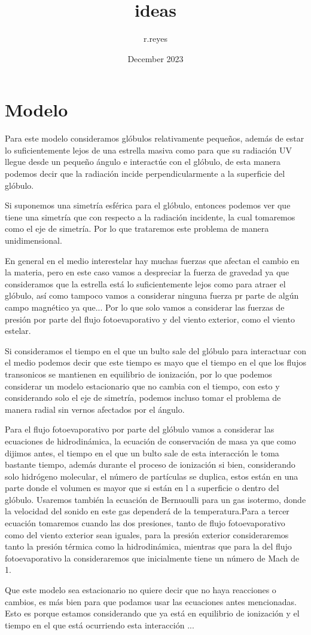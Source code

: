 \documentclass{article}
\title{ideas}
\author{r.reyes }
\date{December 2023}
\begin{document}
\maketitle

\section{Modelo}

Para este modelo consideramos glóbulos relativamente pequeños, además de estar lo suficientemente lejos de una estrella masiva como para que su radiación UV llegue desde un pequeño ángulo e interactúe con el glóbulo, de esta manera podemos decir que la radiación incide perpendicularmente a la superficie del glóbulo.

Si suponemos una simetría esférica para el glóbulo, entonces podemos ver que tiene una simetría que con respecto a la radiación incidente, la cual tomaremos como el eje de simetría.  Por lo que trataremos este problema de manera unidimensional. 

En general en el medio interestelar hay muchas fuerzas que afectan el cambio en la materia, pero en este caso vamos a despreciar la fuerza de gravedad ya que consideramos que la estrella está lo suficientemente lejos como para atraer el glóbulo, así como tampoco vamos a considerar ninguna fuerza pr parte de algún campo magnético ya que...
Por lo que solo vamos a considerar las fuerzas de presión por parte del flujo fotoevaporativo y del viento exterior, como el viento estelar.

Si consideramos el tiempo en el que un bulto sale del glóbulo para interactuar con el medio podemos decir que este tiempo es mayo que el tiempo en el que los flujos transonicos se mantienen en equilibrio de ionización, por lo que podemos considerar un modelo estacionario que no cambia con el tiempo, con esto y considerando solo el eje de simetría, podemos incluso tomar el problema de manera radial sin vernos afectados por el ángulo.

Para el flujo fotoevaporativo por parte del glóbulo vamos a considerar las ecuaciones de hidrodinámica, la ecuación de conservación de masa ya que como dijimos antes, el tiempo en el que un bulto sale de esta interacción le toma bastante tiempo, además durante el proceso de ionización si bien, considerando solo hidrógeno molecular, el número de partículas se duplica, estos están en una parte donde el volumen es mayor que si están en l a superficie o dentro del glóbulo. Usaremos también la ecuación de Bernuoulli para un gas isotermo, donde la velocidad del sonido en este gas dependerá de la temperatura.Para a tercer ecuación tomaremos cuando las dos presiones, tanto de flujo fotoevaporativo como del viento exterior sean iguales, para la presión exterior consideraremos tanto la presión térmica como la hidrodinámica, mientras que para la del flujo fotoevaporativo la consideraremos que inicialmente tiene un número de Mach de 1.


Que este modelo sea estacionario no quiere decir que no haya reacciones o cambios, es más bien para que podamos usar las ecuaciones antes mencionadas. Esto es porque estamos considerando que ya está en equilibrio de ionización y el tiempo en el que está ocurriendo esta interacción ...
\end{document}
